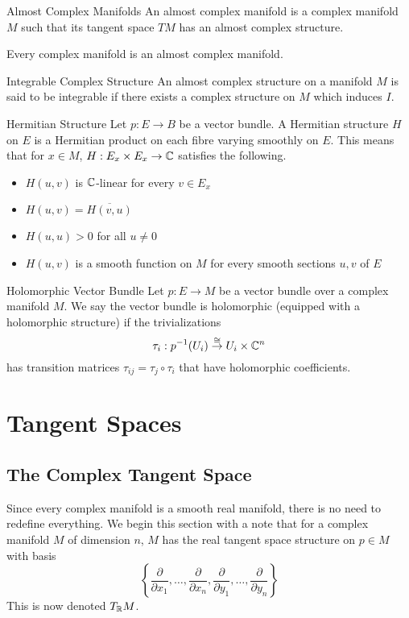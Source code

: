 \documentclass[a4paper]{article}
\begin{document}
\begin{defn}{Almost Complex Manifolds}{} An almost complex manifold is a complex manifold $M$ such that its tangent space $TM$ has an almost complex structure. 
\end{defn}

\begin{prp}{}{} Every complex manifold is an almost complex manifold. 
\end{prp}

\begin{defn}{Integrable Complex Structure}{} An almost complex structure on a manifold $M$ is said to be integrable if there exists a complex structure on $M$ which induces $I$. 
\end{defn}

\begin{defn}{Hermitian Structure}{} Let $p:E\to B$ be a vector bundle. A Hermitian structure $H$ on $E$ is a Hermitian product on each fibre varying smoothly on $E$. This means that for $x\in M$, $H:E_x\times E_x\to\mathbb{C}$ satisfies the following.
\begin{itemize}
\item $H(u,v)$ is $\mathbb{C}$-linear for every $v\in E_x$
\item $H(u,v)=\overline{H(v,u)}$
\item $H(u,u)>0$ for all $u\neq 0$
\item $H(u,v)$ is a smooth function on $M$ for every smooth sections $u,v$ of $E$
\end{itemize}
\end{defn}

\begin{defn}{Holomorphic Vector Bundle}{} Let $p:E\to M$ be a vector bundle over a complex manifold $M$. We say the vector bundle is holomorphic (equipped with a holomorphic structure) if the trivializations $$\tau_i:p^{-1}(U_i)\overset{\cong}{\to}U_i\times\mathbb{C}^n$$ has transition matrices $\tau_{ij}=\tau_j\circ\tau_i$ that have holomorphic coefficients. 
\end{defn}

\pagebreak
\section{Tangent Spaces}
\subsection{The Complex Tangent Space}
Since every complex manifold is a smooth real manifold, there is no need to redefine everything. We begin this section with a note that for a complex manifold $M$ of dimension $n$, $M$ has the real tangent space structure on $p\in M$ with basis $$\left\{\frac{\partial}{\partial x_1},\dots,\frac{\partial}{\partial x_n},\frac{\partial}{\partial y_1},\dots,\frac{\partial}{\partial y_n}\right\}$$ This is now denoted $T_{\mathbb{R}}M$. \\~\\
\end{document}
